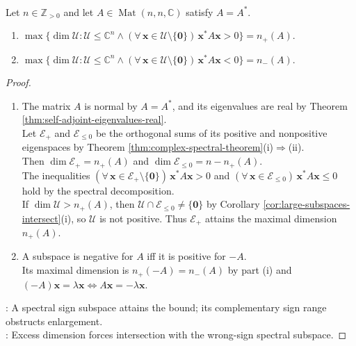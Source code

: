 \begin{lemma} \label{lem:positive-subspace-dimension-inertia} \\
Let $n\in\mathbb{Z}_{>0}$ and let $A\in\operatorname{Mat}(n,n,\mathbb{C})$ satisfy $A=A^*$.
\begin{enumerate}[label=(\roman*)]
\setlength{\itemsep}{0pt}
\item $\max\{\dim\mathcal{U}:\mathcal{U}\leq\mathbb{C}^n\land(\forall\,\mathbf{x}\in\mathcal{U}\setminus\{\mathbf{0}\})\,\mathbf{x}^*A\mathbf{x}>0\}=n_+(A)$.
\item $\max\{\dim\mathcal{U}:\mathcal{U}\leq\mathbb{C}^n\land(\forall\,\mathbf{x}\in\mathcal{U}\setminus\{\mathbf{0}\})\,\mathbf{x}^*A\mathbf{x}<0\}=n_-(A)$.
\end{enumerate}
\begin{proof}
\begin{enumerate}[label=(\roman*)]
\setlength{\itemsep}{0pt}
\item The matrix $A$ is normal by $A=A^*$, and its eigenvalues are real by Theorem \ref{thm:self-adjoint-eigenvalues-real}.\\
Let $\mathcal{E}_+$ and $\mathcal{E}_{\leq0}$ be the orthogonal sums of its positive and nonpositive eigenspaces by Theorem \ref{thm:complex-spectral-theorem}(i)$\Rightarrow$(ii).\\
Then $\dim\mathcal{E}_+=n_+(A)$ and $\dim\mathcal{E}_{\leq0}=n-n_+(A)$.\\
The inequalities $(\forall\,\mathbf{x}\in\mathcal{E}_+\setminus\{\mathbf{0}\})\,\mathbf{x}^*A\mathbf{x}>0$ and $(\forall\,\mathbf{x}\in\mathcal{E}_{\leq0})\,\mathbf{x}^*A\mathbf{x}\leq0$ hold by the spectral decomposition.\\
If $\dim\mathcal{U}>n_+(A)$, then $\mathcal{U}\cap\mathcal{E}_{\leq0}\neq\{\mathbf{0}\}$ by Corollary \ref{cor:large-subspaces-intersect}(i), so $\mathcal{U}$ is not positive. Thus $\mathcal{E}_+$ attains the maximal dimension $n_+(A)$.
\item A subspace is negative for $A$ iff it is positive for $-A$.\\
Its maximal dimension is $n_+(-A)=n_-(A)$ by part (i) and $(-A)\mathbf{x}=\lambda\mathbf{x}\Longleftrightarrow A\mathbf{x}=-\lambda\mathbf{x}$.
\end{enumerate}
: A spectral sign subspace attains the bound; its complementary sign range obstructs enlargement.\\
: Excess dimension forces intersection with the wrong-sign spectral subspace.
\end{proof}
\end{lemma}

